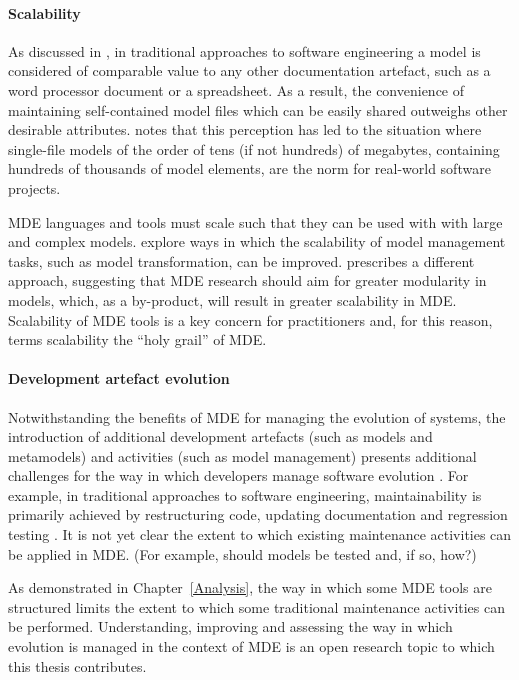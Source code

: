 \paragraph{Scalability} As discussed in \cite{rose10concordance}, in traditional approaches to software engineering a model is considered of comparable value to any other documentation artefact, such as a word processor document or a spreadsheet. As a result, the convenience of maintaining self-contained model files which can be easily shared outweighs other desirable attributes. \cite{kolovos08scalability} notes that this perception has led to the situation where single-file models of the order of tens (if not hundreds) of megabytes, containing hundreds of thousands of model elements, are the norm for real-world software projects.

MDE languages and tools must scale such that they can be used with with large and complex models. \cite{hearnden06incremental,rath08live,tratt08change} explore ways in which the scalability of model management tasks, such as model transformation, can be improved. \cite{kolovos08scalability} prescribes a different approach, suggesting that MDE research should aim for greater modularity in models, which, as a by-product, will result in greater scalability in MDE. Scalability of MDE tools is a key concern for practitioners and, for this reason, \cite{kolovos08scalability} terms scalability the ``holy grail'' of MDE.

\paragraph{Development artefact evolution} Notwithstanding the benefits of MDE for managing the evolution of systems, the introduction of additional development artefacts (such as models and metamodels) and activities (such as model management) presents additional challenges for the way in which developers manage software evolution \cite{Mens07}. For example, in traditional approaches to software engineering, maintainability is primarily achieved by restructuring code, updating documentation and regression testing \cite{feathers04working}. It is not yet clear the extent to which existing maintenance activities can be applied in MDE. (For example, should models be tested and, if so, how?)

As demonstrated in Chapter~\ref{Analysis}, the way in which some MDE tools are structured limits the extent to which some traditional maintenance activities can be performed. Understanding, improving and assessing the way in which evolution is managed in the context of MDE is an open research topic to which this thesis contributes. 

